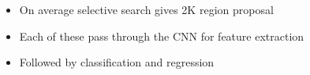 \begin{frame}
\begin{columns}
		\begin{overlayarea}{\textwidth}{\textheight}
			\begin{itemize}
				\justifying
				\item<2-> On average selective search gives 2K region proposal
				\item<4-> Each of these pass through the CNN for feature extraction 
				\item<5-> Followed by classification and regression 
			\end{itemize}
			
		\end{overlayarea}
		
	\end{columns}
\end{frame}



